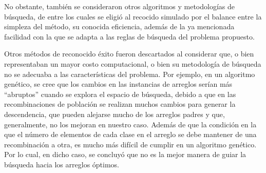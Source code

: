 No obstante, también se consideraron otros algoritmos y metodologías de búsqueda, de entre los cuales se eligió al recocido simulado por el balance entre la simpleza del método, su conocida eficiencia, además de la ya mencionada facilidad con la que se adapta a las reglas de búsqueda del problema propuesto.

Otros métodos de reconocido éxito fueron descartados al considerar que, o bien representaban un mayor costo computacional, o bien su metodología de búsqueda no se adecuaba a las características del problema.
Por ejemplo, en un algoritmo genético, se cree que los cambios en las instancias de arreglos serían más ``abruptos'' cuando se explora el espacio de búsqueda, debido a que en las recombinaciones de población se realizan muchos cambios para generar la descendencia, que pueden alejarse mucho de los arreglos padres y que, generalmente, no los mejoran en nuestro caso.
Además de que la condición en la que el número de elementos de cada clase en el arreglo se debe mantener de una recombinación a otra, es mucho más difícil de cumplir en un algoritmo genético.
Por lo cual, en dicho caso, se concluyó que no es la mejor manera de guiar la búsqueda hacia los arreglos óptimos.

